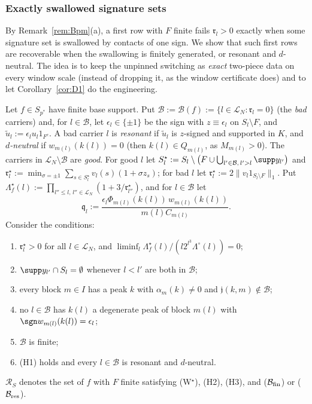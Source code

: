 
\subsubsection*{Exactly swallowed signature sets}
By Remark~\ref{rem:Bpm}(a), a first row with $F$ finite fails
$\mathfrak r_l>0$ exactly when some signature set is swallowed by contacts
of one sign.  We show that such first rows are recoverable when the
swallowing is finitely generated, or resonant and $d$-neutral.  The idea
is to keep the unpinned switching as \emph{exact} two-piece data on every
window scale (instead of dropping it, as the window certificate does) and
to let Corollary~\ref{cor:D1} do the engineering.

\begin{definition}\label{def:swallowed}
Let $f\in S_{p^*}$ have finite base support.  Put $\mathcal B:=\mathcal
B(f):=\{l\in\mathcal L_N:\mathfrak r_l=0\}$ (the \emph{bad} carriers) and,
for $l\in\mathcal B$, let $\epsilon_l\in\{\pm1\}$ be the sign with
$z\equiv\epsilon_l$ on $S_l\setminus F$, and $\tilde u_l:=\epsilon_lu_l
1_{F^c}$.  A bad carrier $l$ is \emph{resonant} if $\tilde u_l$ is
$z$-signed and supported in $K$, and \emph{$d$-neutral} if
$w_{m(l)}(k(l))=0$ (then $k(l)\in Q_{m(l)}$, as $M_{m(l)}>0$).  The carriers
in $\mathcal L_N\setminus\mathcal B$ are \emph{good}.  For good $l$ let
$S^\star_l:=S_l\setminus\big(F\cup\bigcup_{l'\in\mathcal B,\,l'>l}\supp
y_{l'}\big)$ and $\mathfrak r^\star_l:=\min_{\sigma=\pm1}\sum_{s\in
S^\star_l}v_l(s)(1+\sigma z_s)$; for bad $l$ let $\mathfrak r^\star_l:=
2\|v_l1_{S_l\setminus F}\|_1$.  Put $\Lambda^\star_f(l):=\prod_{l''\le l,\,
l''\in\mathcal L_N}(1+3/\mathfrak r^\star_{l''})$, and for $l\in\mathcal B$
let
\[
 \mathfrak q_l:=\frac{\epsilon_l\Phi_{m(l)}(k(l))\,w_{m(l)}(k(l))}{m(l)C_{m(l)}} .
\]
Consider the conditions:
\begin{enumerate}
\item[(W$^\star$)] $\mathfrak r^\star_l>0$ for all $l\in\mathcal L_N$, and
$\liminf_l\Lambda^\star_f(l)/(l2^{l^3}\Lambda^\circ(l))=0$;
\item[(H1)] $\supp y_{l'}\cap S_l=\emptyset$ whenever $l<l'$ are both in
$\mathcal B$;
\item[(H2)] every block $m\in I$ has a peak $k$ with $\alpha_m(k)\ne0$
and $\mathfrak j(k,m)\notin\mathcal B$;
\item[(H3)] no $l\in\mathcal B$ has $k(l)$ a degenerate peak of block
$m(l)$ with $\sgn w_{m(l)}(k(l))=\epsilon_l$;
\item[($\mathcal B_{\rm fin}$)] $\mathcal B$ is finite;
\item[($\mathcal B_{\rm res}$)] \textup{(H1)} holds and every $l\in\mathcal
B$ is resonant and $d$-neutral.
\end{enumerate}
$\mathcal R_S$ denotes the set of $f$ with $F$ finite satisfying
\textup{(W$^\star$)}, \textup{(H2)}, \textup{(H3)}, and
\textup{($\mathcal B_{\rm fin}$)} or \textup{($\mathcal B_{\rm res}$)}.
\end{definition}

